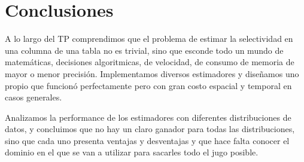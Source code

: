 \section{Conclusiones}
A lo largo del TP comprendimos que el problema de estimar la selectividad en una columna de una tabla no es trivial, sino que esconde todo un mundo de matemáticas, decisiones algoritmicas, de velocidad, de consumo de memoria de mayor o menor precisión. Implementamos diversos estimadores y diseñamos uno propio que funcionó perfectamente pero con gran costo espacial y temporal en casos generales.

Analizamos la performance de los estimadores con diferentes distribuciones de datos, y concluimos que no hay un claro ganador para todas las distribuciones, sino que cada uno presenta ventajas y desventajas y que hace falta conocer el dominio en el que se van a utilizar para sacarles todo el jugo posible.

